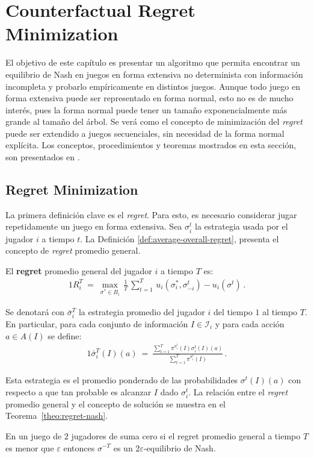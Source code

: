 \chapter{Counterfactual Regret Minimization}
\label{chapter:cfr}

El objetivo de este capítulo es presentar un algoritmo que permita encontrar un equilibrio de Nash en juegos en forma extensiva no determinista con información incompleta y probarlo empíricamente en distintos juegos. Aunque todo juego en forma extensiva puede ser representado en forma normal, esto no es de mucho interés, pues la forma normal puede tener un tamaño exponencialmente más grande al tamaño del árbol. Se verá como el concepto de minimización del \textit{regret} puede ser extendido a juegos secuenciales, sin necesidad de la forma normal explícita. Los conceptos, procedimientos y teoremas mostrados en esta sección, son presentados en \cite{bib:cfr}.

\section{Regret Minimization}

La primera definición clave es el \textit{regret}. Para esto, es necesario considerar jugar repetidamente un juego en forma extensiva. Sea $\sigma_i^t$ la estrategia usada por el jugador $i$ a tiempo $t$. La Definición \ref{def:average-overall-regret}, presenta el concepto de \textit{regret} promedio general.

\begin{definition}
\label{def:average-overall-regret}
El \textbf{regret} promedio general del jugador $i$ a tiempo $T$ es:
\begin{alignat}{1}
R_i^T\ =\ \max_{\sigma^* \in B_i} \, \frac{1}{T}\, \sum_{t = 1}^T \, u_i(\sigma_i^*, \sigma_{-i}^t) - u_i(\sigma^t) \,.
\end{alignat}
\end{definition}

Se denotará con $\bar{\sigma}_i^{T}$ la estrategia promedio del jugador $i$ del tiempo $1$ al tiempo $T$. En particular, para cada conjunto de información $I \in \mathcal{I}_i$ y para cada acción $a \in A(I)$ se define:
\begin{alignat}{1}
\bar{\sigma}_i^{T}(I)(a)\ =\ \frac{\sum_{t = 1}^T \pi^{\sigma^t_i}(I)\sigma^t_i(I)(a)}{\sum_{t = 1}^T \pi^{\sigma_i^t}(I)} \,.
\end{alignat}

Esta estrategia es el promedio ponderado de las probabilidades $\sigma^t(I)(a)$ con respecto a que tan probable es alcanzar $I$ dado $\sigma_i^t$. La relación entre el \textit{regret} promedio general y el concepto de solución se muestra en el Teorema~\ref{theo:regret-nash}.
\begin{theorem}
\label{theo:regret-nash}
En un juego de $2$ jugadores de suma cero si el regret promedio general a tiempo $T$ es menor que $\varepsilon$ entonces $\sigma^{-T}$ es un $2\varepsilon$-equilibrio de Nash.
\end{theorem}

